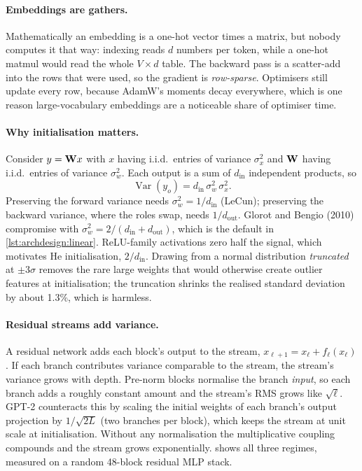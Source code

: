 \paragraph{Embeddings are gathers.} Mathematically an embedding is a one-hot vector times a
matrix, but nobody computes it that way: indexing reads $d$ numbers per token, while a one-hot matmul
would read the whole $V\times d$ table. The backward pass is a scatter-add into the rows that were
used, so the gradient is \emph{row-sparse}. Optimisers still update every row, because AdamW's
moments decay everywhere, which is one reason large-vocabulary embeddings are a noticeable share of
optimiser time.

\paragraph{Why initialisation matters.} Consider $y=\mathbf{W}x$ with $x$ having i.i.d.\ entries of
variance $\sigma_x^2$ and $\mathbf{W}$ having i.i.d.\ entries of variance $\sigma_w^2$. Each output is a
sum of $d_\text{in}$ independent products, so
\begin{equation}
\operatorname{Var}(y_o) = d_\text{in}\,\sigma_w^2\,\sigma_x^2 .
\label{eq:archdesign:var}
\end{equation}
Preserving the forward variance needs $\sigma_w^2 = 1/d_\text{in}$ (LeCun); preserving the
backward variance, where the roles swap, needs $1/d_\text{out}$. Glorot and Bengio (2010)
compromise with $\sigma_w^2 = 2/(d_\text{in}+d_\text{out})$, which is the default in
\cref{lst:archdesign:linear}. ReLU-family activations zero half the signal, which motivates He
initialisation, $2/d_\text{in}$. Drawing from a normal distribution \emph{truncated} at $\pm3\sigma$
removes the rare large weights that would otherwise create outlier features at initialisation; the
truncation shrinks the realised standard deviation by about 1.3\%, which is harmless.

\paragraph{Residual streams add variance.} A residual network adds each block's output to the
stream, $x_{\ell+1}=x_\ell+f_\ell(x_\ell)$. If each branch contributes variance comparable to the
stream, the stream's variance grows with depth. Pre-norm blocks normalise the branch \emph{input},
so each branch adds a roughly constant amount and the stream's RMS grows like $\sqrt{\ell}$. GPT-2
counteracts this by scaling the initial weights of each branch's output projection by
$1/\sqrt{2L}$ (two branches per block), which keeps the stream at unit scale at initialisation.
Without any normalisation the multiplicative coupling compounds and the stream grows
exponentially.  shows all three regimes, measured on a random
48-block residual MLP stack.

